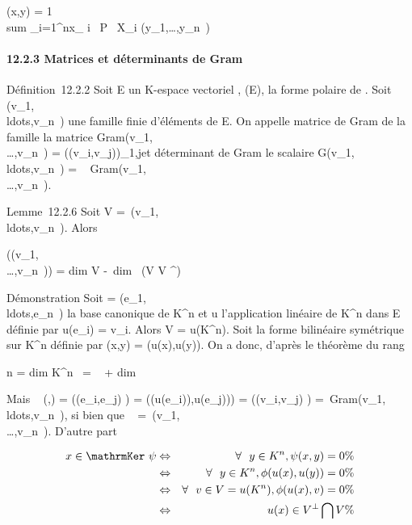 \documentclass[]{article}
\begin{document}
\phi(x,y) = 1  \\sum
_i=1^nx_ i \partial~P \over
\partial~X_i
(y_1,\ldots,y_n~)

\paragraph{12.2.3 Matrices et déterminants de Gram}

Définition~12.2.2 Soit E un K-espace vectoriel , \Phi \inQ(E), \phi la forme
polaire de \Phi. Soit
(v_1,\\ldots,v_n~)
une famille finie d'éléments de E. On appelle matrice de Gram de la
famille la matrice
Gram(v_1,\\\ldots,v_n~)
= (\phi(v_i,v_j))_1\leqi,j\leqn et déterminant de Gram
le scalaire
G(v_1,\\ldots,v_n~)
= ~
Gram(v_1,\\\ldots,v_n~).

Lemme~12.2.6 Soit V =\
\mathrmVect(v_1,\\ldots,v_n~).
Alors

\mathrmrg(\Gram(v_1,\\\ldots,v_n~))
= dim V -\ dim~ (V \bigcap
V ^\bot)

Démonstration Soit  =
(e_1,\\ldots,e_n~)
la base canonique de K^n et u l'application linéaire de
K^n dans E définie par u(e_i) = v_i. Alors
V = u(K^n). Soit \psi la forme bilinéaire symétrique sur
K^n définie par \psi(x,y) = \phi(u(x),u(y)). On a donc, d'après le
théorème du rang

n = dim K^n~
= \mathrmrg~\psi
+ dim~
\mathrmKer~\psi

Mais \mathrmMat~ (\psi,) =
\left (\psi(e_i,e_j)\right
) = \left
(\phi(u(e_i)),u(e_j))\right ) =
\left (\phi(v_i,v_j)\right
) =\
Gram(v_1,\\ldots,v_n~),
si bien que \mathrmrg~\psi
=\
\mathrmrgGram(v_1,\\\ldots,v_n~).
D'autre part

\begin{align*} x
\in\mathrmKer~\psi&
\Leftrightarrow & \forall~~y \in
K^n, \psi(x,y) = 0 \%& \\ &
\Leftrightarrow & \forall~~y \in
K^n,\phi(u(x),u(y)) = 0 \%& \\ &
\Leftrightarrow & \forall~~v \in V =
u(K^n), \phi(u(x),v) = 0\%& \\ &
\Leftrightarrow & u(x) \in V ^\bot\bigcap V \%&
\\ \end{align*}
\end{document}
